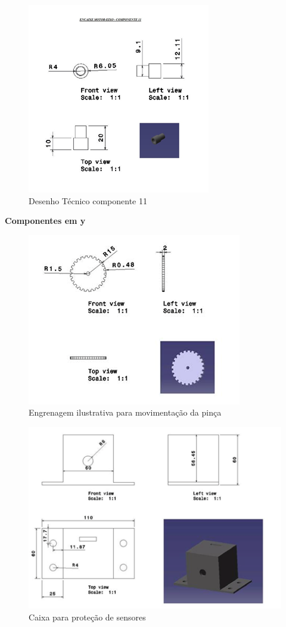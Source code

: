 \begin{apendicesenv}
\begin{figure}[H]
		\centering
			\includegraphics[scale=1.0]{figuras/tec11.png}
		\caption{Desenho Técnico componente 11}
		\label{tec11}
\end{figure}

\textbf{Componentes em y}

\begin{figure}[H]
		\centering
			\includegraphics[scale=1.0]{figuras/tec12.png}
		\caption{Engrenagem ilustrativa para movimentação da pinça}
		\label{tec12}
\end{figure}

\begin{figure}[H]
		\centering
			\includegraphics[scale=1.0]{figuras/tec13.png}
		\caption{Caixa para proteção de sensores}
		\label{tec13}
\end{figure}


\end{apendicesenv}
